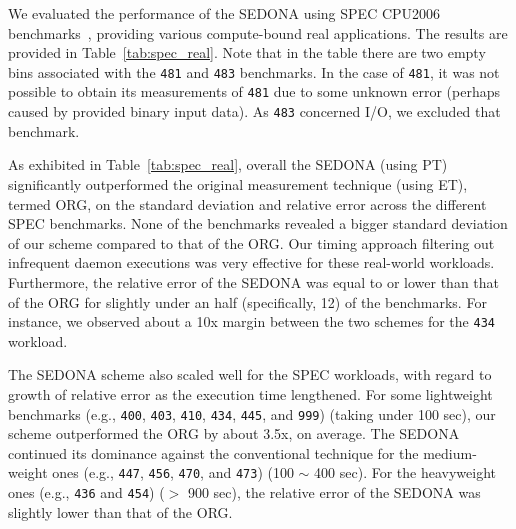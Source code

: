 \documentclass[letter]{ieice}
\begin{document}
We evaluated the performance of the SEDONA using SPEC CPU2006 
benchmarks~\cite{specCpu2006}, providing various compute-bound real applications. 
The results are provided in Table~\ref{tab:spec_real}.
Note that in the table there are two empty bins associated with 
the {\tt 481} and {\tt 483} benchmarks. 
In the case of {\tt 481}, it was not possible to obtain its 
measurements of {\tt 481} due to some unknown error 
(perhaps caused by provided binary input data). 
As {\tt 483} concerned I/O, we excluded that benchmark. 

As exhibited in Table~\ref{tab:spec_real}, overall 
the SEDONA (using PT) significantly outperformed the original 
measurement technique (using ET), termed ORG, 
on the standard deviation and relative error across the different SPEC benchmarks. 
None of the benchmarks revealed a bigger standard deviation of our scheme compared to that of the ORG.
Our timing approach filtering out infrequent daemon executions 
was very effective for these real-world workloads. 
Furthermore, the relative error of the SEDONA was equal to or 
lower than that of the ORG for slightly under an half (specifically, 12) of the benchmarks. 
For instance, we observed about a 10x margin between the two schemes for the 
{\tt 434} workload.

The SEDONA scheme also scaled well for the SPEC workloads, 
with regard to growth of relative error as the execution time lengthened.
For some lightweight benchmarks 
(e.g., {\tt 400}, {\tt 403}, {\tt 410}, 
{\tt 434}, {\tt 445}, and {\tt 999})  (taking under 100 sec), 
our scheme outperformed the ORG by about 3.5x, on average. 
The SEDONA continued its dominance against the conventional technique 
for the medium-weight ones (e.g., {\tt 447}, {\tt 456}, {\tt 470}, and {\tt 473}) (100 $\sim$ 400 sec). 
For the heavyweight ones (e.g., {\tt 436} and {\tt 454}) ($>$ 900 sec), 
the relative error of the \hbox{SEDONA} was slightly lower than that of the ORG.

\end{document}
